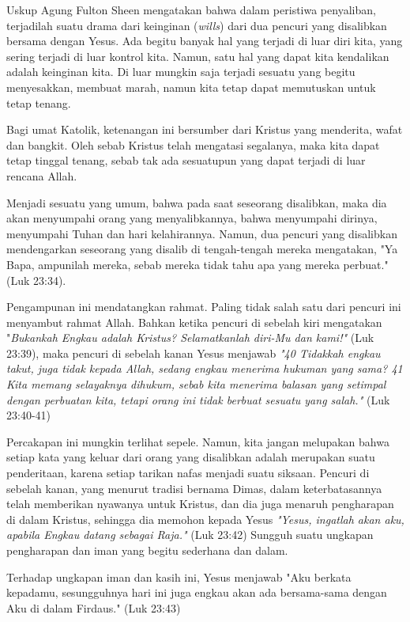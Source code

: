 Uskup Agung Fulton Sheen mengatakan bahwa dalam peristiwa penyaliban,
terjadilah suatu drama dari keinginan (\textit{wills}) dari dua pencuri yang disalibkan
bersama dengan Yesus. Ada begitu banyak hal yang terjadi di luar diri kita,
yang sering terjadi di luar kontrol kita. Namun, satu hal yang dapat kita
kendalikan adalah keinginan kita. Di luar mungkin saja terjadi sesuatu yang
begitu menyesakkan, membuat marah, namun kita tetap dapat memutuskan untuk
tetap tenang. 

Bagi umat Katolik, ketenangan ini bersumber dari Kristus yang
menderita, wafat dan bangkit. Oleh sebab Kristus telah mengatasi segalanya,
maka kita dapat tetap tinggal tenang, sebab tak ada sesuatupun yang dapat
terjadi di luar rencana Allah.

Menjadi sesuatu yang umum, bahwa pada saat seseorang disalibkan, maka dia akan
menyumpahi orang yang menyalibkannya, bahwa menyumpahi dirinya, menyumpahi
Tuhan dan hari kelahirannya. 
Namun, dua pencuri yang disalibkan mendengarkan
seseorang yang disalib di tengah-tengah mereka mengatakan, "Ya Bapa, ampunilah
mereka, sebab mereka tidak tahu apa yang mereka perbuat." (Luk 23:34).

Pengampunan ini mendatangkan rahmat. Paling tidak salah satu dari pencuri ini
menyambut rahmat Allah. Bahkan ketika pencuri di sebelah kiri mengatakan
"\textit{Bukankah Engkau adalah Kristus? Selamatkanlah diri-Mu dan kami!"} (Luk 23:39),
maka pencuri di sebelah kanan Yesus menjawab 
\textit{"40 Tidakkah engkau takut, juga
tidak kepada Allah, sedang engkau menerima hukuman yang sama? 41  Kita memang
selayaknya dihukum, sebab kita menerima balasan yang setimpal dengan perbuatan
kita, tetapi orang ini tidak berbuat sesuatu yang salah."} (Luk 23:40-41)

Percakapan ini mungkin terlihat sepele. Namun, kita jangan melupakan bahwa
setiap kata yang keluar dari orang yang disalibkan adalah merupakan suatu
penderitaan, karena setiap tarikan nafas menjadi suatu siksaan. Pencuri di
sebelah kanan, yang menurut tradisi bernama Dimas, dalam keterbatasannya telah
memberikan nyawanya untuk Kristus, dan dia juga menaruh pengharapan di dalam
Kristus, sehingga dia memohon kepada Yesus \textit{"Yesus, ingatlah akan aku, apabila
Engkau datang sebagai Raja."} (Luk 23:42) Sungguh suatu ungkapan pengharapan dan
iman yang begitu sederhana dan dalam. 

Terhadap ungkapan iman dan kasih ini,
Yesus menjawab "Aku berkata kepadamu, sesungguhnya hari ini juga engkau akan
ada bersama-sama dengan Aku di dalam Firdaus." (Luk 23:43)

